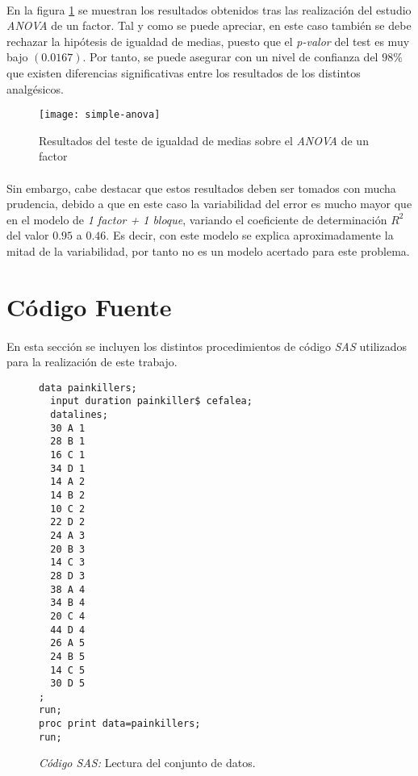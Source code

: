 \documentclass[11pt]{article}
\begin{document}
      \paragraph{}
      En la figura \ref{fig:simple-anova-results} se muestran los resultados obtenidos tras las realización del estudio \emph{ANOVA} de un factor. Tal y como se puede apreciar, en este caso también se debe rechazar la hipótesis de igualdad de medias, puesto que el \emph{p-valor} del test es muy bajo $(0.0167)$. Por tanto, se puede asegurar con un nivel de confianza del $98\%$ que existen diferencias significativas entre los resultados de los distintos analgésicos.

      \begin{figure}[!h]
        \centering
        \texttt{[image: simple-anova]}
        \caption{Resultados del teste de igualdad de medias sobre el \emph{ANOVA} de un factor}
        \label{fig:simple-anova-results}
      \end{figure}


      \paragraph{}
      Sin embargo, cabe destacar que estos resultados deben ser tomados con mucha prudencia, debido a que en este caso la variabilidad  del error es mucho mayor que en el modelo de \emph{1 factor + 1 bloque}, variando el coeficiente de determinación $R^2$ del valor $0.95$ a $0.46$. Es decir, con este modelo se explica aproximadamente la mitad de la variabilidad, por tanto no es un modelo acertado para este problema.

  \section{Código Fuente}

    \paragraph{}
    En esta sección se incluyen los distintos procedimientos de código \emph{SAS} utilizados para la realización de este trabajo.

    \begin{figure}[!h]
      \centering
      \begin{verbatim}
data painkillers;
  input duration painkiller$ cefalea;
  datalines;
  30 A 1
  28 B 1
  16 C 1
  34 D 1
  14 A 2
  14 B 2
  10 C 2
  22 D 2
  24 A 3
  20 B 3
  14 C 3
  28 D 3
  38 A 4
  34 B 4
  20 C 4
  44 D 4
  26 A 5
  24 B 5
  14 C 5
  30 D 5
;
run;
proc print data=painkillers;
run;
      \end{verbatim}
      \caption{\emph{Código SAS:} Lectura del conjunto de datos.}
      \label{code:sas_1}
    \end{figure}
\end{document}
